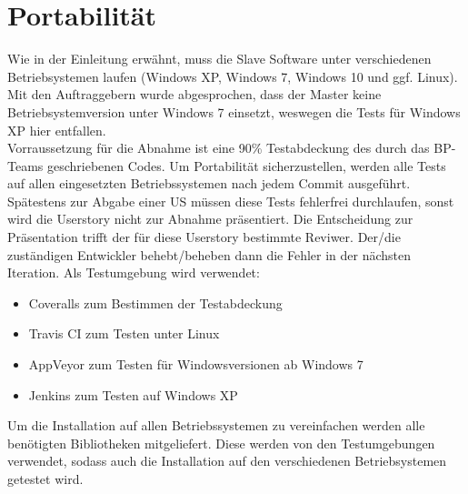 \documentclass[accentcolor=tud9c,12pt,paper=a4]{tudreport}
\begin{document}
		\section{Portabilität}
		Wie in der Einleitung erwähnt, muss die Slave Software unter verschiedenen 
		Betriebsystemen laufen (Windows XP, Windows 7, Windows 10 und ggf. Linux).
		Mit den Auftraggebern wurde abgesprochen, dass der Master keine 
		Betriebsystemversion unter Windows 7 einsetzt, weswegen die Tests für Windows
		XP hier entfallen.
		\\[5pt]
		Vorraussetzung für die Abnahme ist eine 90\% Testabdeckung des durch das
		BP-Teams geschriebenen Codes.
		Um Portabilität sicherzustellen, werden alle Tests auf allen eingesetzten
		Betriebssystemen nach jedem Commit ausgeführt. Spätestens zur Abgabe einer
		US müssen diese Tests fehlerfrei durchlaufen, sonst wird die Userstory nicht
		zur Abnahme präsentiert. Die Entscheidung zur Präsentation trifft der für diese
		Userstory bestimmte Reviwer. Der/die zuständigen Entwickler behebt/beheben dann die Fehler
		in der nächsten Iteration.
		Als Testumgebung wird verwendet:
		\begin{itemize}
			\item Coveralls zum Bestimmen der Testabdeckung
			\item Travis CI zum Testen unter Linux
			\item AppVeyor zum Testen für Windowsversionen ab Windows 7
			\item Jenkins zum Testen auf Windows XP
		\end{itemize}
		Um die Installation auf allen Betriebssystemen zu vereinfachen werden alle benötigten
		Bibliotheken mitgeliefert. Diese werden von den Testumgebungen verwendet, sodass
		auch die Installation auf den verschiedenen Betriebsystemen getestet wird.
\end{document}
